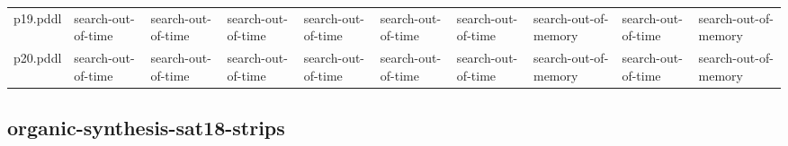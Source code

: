 \documentclass{article}
\begin{document}
\begin{tabular}{@{}lrrrrrrrrr@{}}
p19.pddl & \multicolumn{1}{|l|}{search-out-of-time} & \multicolumn{1}{|l|}{search-out-of-time} & \multicolumn{1}{|l|}{search-out-of-time} & \multicolumn{1}{|l|}{search-out-of-time} & \multicolumn{1}{|l|}{search-out-of-time} & \multicolumn{1}{|l|}{search-out-of-time} & \multicolumn{1}{|l|}{search-out-of-memory} & \multicolumn{1}{|l|}{search-out-of-time} & \multicolumn{1}{|l|}{search-out-of-memory} \\
p20.pddl & \multicolumn{1}{|l|}{search-out-of-time} & \multicolumn{1}{|l|}{search-out-of-time} & \multicolumn{1}{|l|}{search-out-of-time} & \multicolumn{1}{|l|}{search-out-of-time} & \multicolumn{1}{|l|}{search-out-of-time} & \multicolumn{1}{|l|}{search-out-of-time} & \multicolumn{1}{|l|}{search-out-of-memory} & \multicolumn{1}{|l|}{search-out-of-time} & \multicolumn{1}{|l|}{search-out-of-memory} \\
\end{tabular}

\hypertarget{error-organic-synthesis-sat18-strips}{}
\subsection*{organic-synthesis-sat18-strips}
\end{document}
